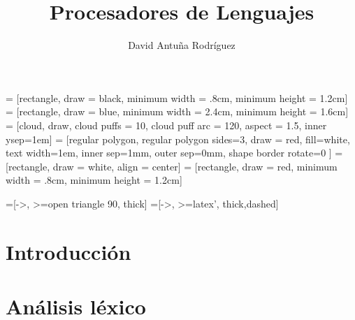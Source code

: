 \documentclass[11pt]{article}
\title{Procesadores de Lenguajes}
\author{David Antuña Rodríguez}
\date{}
\begin{document}
  = [rectangle, draw = black, minimum width = .8cm, minimum height = 1.2cm]
  = [rectangle, draw = blue, minimum width = 2.4cm, minimum height = 1.6cm]
   = [cloud, draw, cloud puffs = 10, cloud puff arc = 120, aspect = 1.5, inner ysep=1em]
   = [regular polygon, regular polygon sides=3, draw = red, fill=white, text width=1em, inner sep=1mm, outer sep=0mm, shape border rotate=0 ]
  = [rectangle, draw = white, align = center]
  = [rectangle, draw = red, minimum width = .8cm, minimum height = 1.2cm]

  =[->, >=open triangle 90, thick]
  =[->, >=latex', thick,dashed]


  \raggedright
  \maketitle
  \newpage
  \tableofcontents
  \newpage

  \section{Introducción}
  {
    \let\section\subsection
    \let\subsection\subsubsection
    
  }

  \section{Análisis léxico}
  {
    \let\section\subsection
    \let\subsection\subsubsection
    
  }
\end{document}

